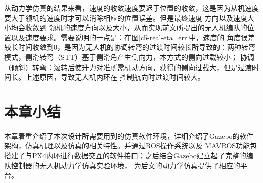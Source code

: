从动力学仿真的结果来看，速度的收敛速度要迟于位置的收敛，这是因为从机速度要大于领机的速度时才可以消除相应的位置误差。但是最终速度
方向以及速度大小均会收敛到
领机的速度方向以及大小，从而实现前文所提出的无人机编队的位置以及速度要求。需要说明的一点是：在图\ref{c5-real-eta_err}中，速度的
角度误差较长时间收敛到0，是因为无人机的协调转弯的过渡时间较长所导致的：两种转弯模式，侧滑转弯（STT）基于侧滑角产生侧向力，本方式的侧向过载较小；
协调（倾斜）转弯：滚转后使升力对准所需机动方向，获得的侧向过载大，但是过渡时间长。\cite{YuJianQiao2010}上述原因，导致无人机内环在
控制航向时过渡时间较大。
\section{本章小结}
本章着重介绍了本次设计所需要用到的仿真软件环境，详细介绍了Gazebo的软件架构，仿真机理以及仿真的相关特性。并通过ROS操作系统以及
MAVROS功能包搭建了与PX4内环进行数据交互的软件接口；之后结合Gazebo建立起了完整的编队控制器的无人机动力学仿真实验环境，
为后文的动力学仿真提供了相应的平台。

